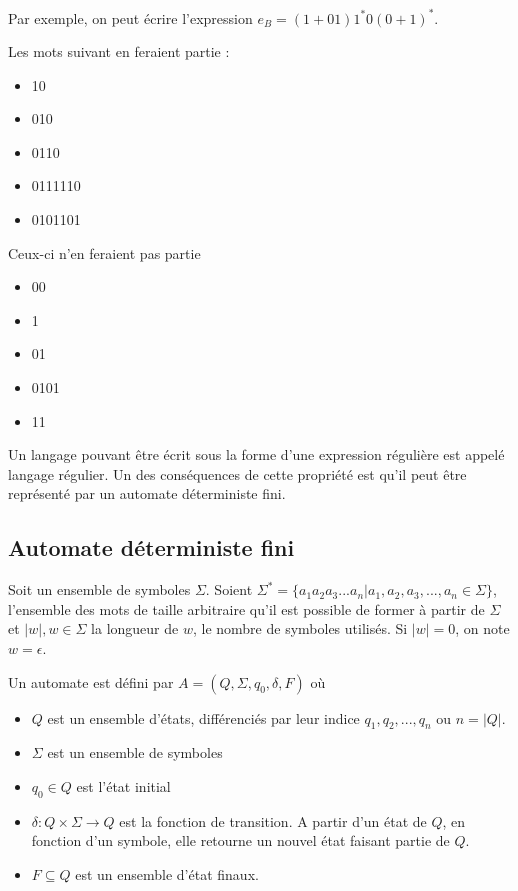 	Par exemple, on peut écrire l'expression $e_B = (1+01)1^*0(0+1)^*$.\\
	
	\begin{minipage}{0.5\linewidth}
		Les mots suivant en feraient partie :
		\begin{itemize}
			\item 10
			\item 010
			\item 0110
			\item 0111110
			\item 0101101
		\end{itemize}
	\end{minipage}
	\begin{minipage}{0.5\linewidth}
		Ceux-ci n'en feraient pas partie
		\begin{itemize}
			\item 00
			\item 1
			\item 01
			\item 0101
			\item 11
		\end{itemize}
	\end{minipage}

	Un langage pouvant être écrit sous la forme d'une expression régulière est appelé langage régulier. Un des conséquences de cette propriété est qu'il peut être représenté par un automate déterministe fini. 
	
	
	\subsection{Automate déterministe fini}\label{sub:dfa}
	Soit un ensemble de symboles $\Sigma$. Soient $\Sigma^* = \{ a_1a_2a_3...a_n | a_1,a_2,a_3,...,a_n \in \Sigma \}$, l'ensemble des mots de taille arbitraire qu'il est possible de former à partir de $\Sigma$ et $|w|, w \in \Sigma$ la longueur de $w$, le nombre de symboles utilisés. Si $|w|=0$, on note $w=\epsilon$.
	
	
	Un automate est défini par $A = (Q, \Sigma, q_0, \delta, F)$ où
	\begin{itemize}
		\item $Q$ est un ensemble d'états, différenciés par leur indice $q_1, q_2, ..., q_n$ ou $n = |Q|$.
		\item $\Sigma$ est un ensemble de symboles
		\item $q_0 \in Q$ est l'état initial
		\item $\delta : Q \times \Sigma \rightarrow Q$ est la fonction de transition. A partir d'un état de $Q$, en fonction d'un symbole, elle retourne un nouvel état faisant partie de $Q$.
		\item $F \subseteq Q$ est un ensemble d'état finaux.
	\end{itemize}
	 
